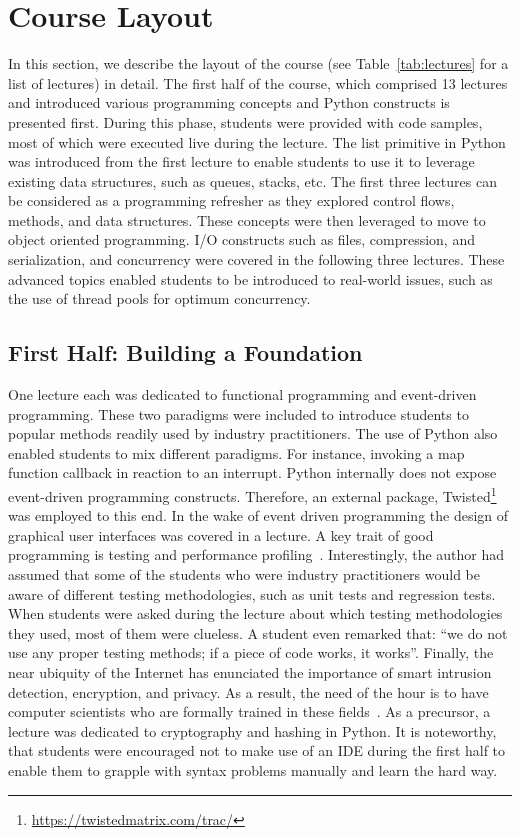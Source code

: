 \documentclass[letterpaper,twocolumn,10pt]{article}
\begin{document}
\section{Course Layout}\label{sec:layout}
In this section, we describe the layout of the course (see
Table~\ref{tab:lectures} for a list of lectures) in detail. The first half of
the course, which comprised 13 lectures and introduced various programming
concepts and Python constructs is presented first. During this phase, students
were provided with code samples, most of which were executed live during the
lecture. The list primitive in Python was introduced from the first lecture to
enable students to use it to leverage existing data structures, such as queues,
stacks, etc. The first three lectures can be considered as a programming
refresher as they explored control flows, methods, and data structures. These
concepts were then leveraged to move to object oriented programming. I/O
constructs such as files, compression, and serialization, and concurrency were
covered in the following three lectures.
These advanced topics enabled students to be introduced to real-world issues,
such as the use of thread pools for optimum concurrency.

\subsection{First Half: Building a Foundation}
One lecture each was dedicated to functional programming and event-driven
programming. These two paradigms were included to introduce students to popular
methods readily used by industry practitioners. The use of Python also enabled
students to mix different paradigms. For instance, invoking a map function
callback in reaction to an interrupt. Python internally does not expose
event-driven programming constructs. Therefore, an external package,
Twisted\footnote{\url{https://twistedmatrix.com/trac/}} was employed to this
end. In the wake of event driven programming the design of graphical user
interfaces was covered in a lecture. A key trait of good programming is testing
and performance profiling~\cite{Chmiel:2004:DNE}. Interestingly, the author had
assumed that some of the students who were industry practitioners would be aware
of different testing methodologies, such as unit tests and regression tests.
When students were asked during the lecture about which testing methodologies
they used, most of them were clueless. A student even remarked that:
``we do not use any proper testing methods; if a piece of code works, it
works''. Finally, the near ubiquity of the Internet has enunciated the
importance of smart intrusion detection, encryption, and privacy. As a result,
the need of the hour is to have computer scientists who are formally trained in
these fields~\cite{Du:2008:SSI}. As a precursor, a lecture was dedicated to
cryptography and hashing in Python. It is noteworthy, that students were
encouraged not to make use of an IDE during the first half to enable them to
grapple with syntax problems manually and learn the hard way.
\end{document}
